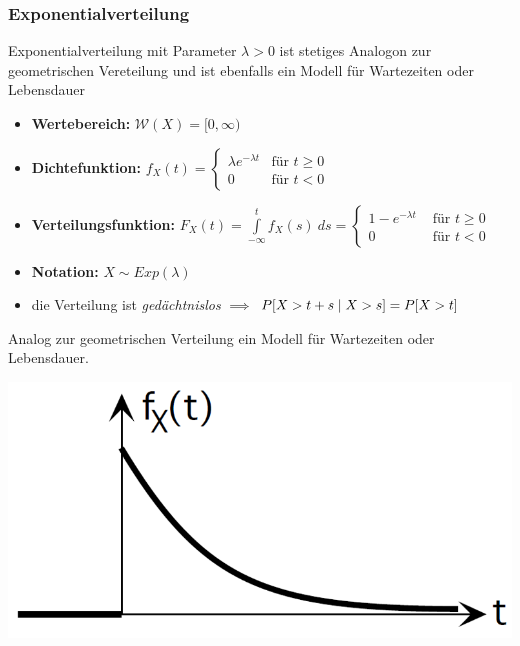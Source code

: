 \subsubsection{Exponentialverteilung}
Exponentialverteilung mit Parameter $\lambda >0$ ist stetiges Analogon zur geometrischen Vereteilung und ist ebenfalls ein Modell für Wartezeiten oder Lebensdauer
\begin{itemize}
\item \textbf{Wertebereich:} $\mathcal{W}(X) = [0, \infty)$
\item \textbf{Dichtefunktion:} $ f_X(t) = \begin{cases} \lambda e^{-\lambda t} & \mbox{für } t \geq 0 \\ 0 & \mbox{für } t < 0 \end{cases}$
\item \textbf{Verteilungsfunktion:} $F_X(t) = \int\limits_{-\infty}^t f_X(s) \: ds = \begin{cases} 1 - e^{-\lambda t} & \text{ für } t \geq 0 \\ 0 & \text{ für } t < 0 \end{cases}$
\item \textbf{Notation:} $X \sim Exp(\lambda)$
\item die Verteilung ist \textit{gedächtnislos} $\implies$ $P[X > t+ s \;|\; X > s ] = P[X>t]$
\end{itemize}
Analog zur geometrischen Verteilung ein Modell für Wartezeiten oder Lebensdauer.
\begin{center}
\includegraphics[scale=0.2]{exponentialverteilung.png}
\end{center}

